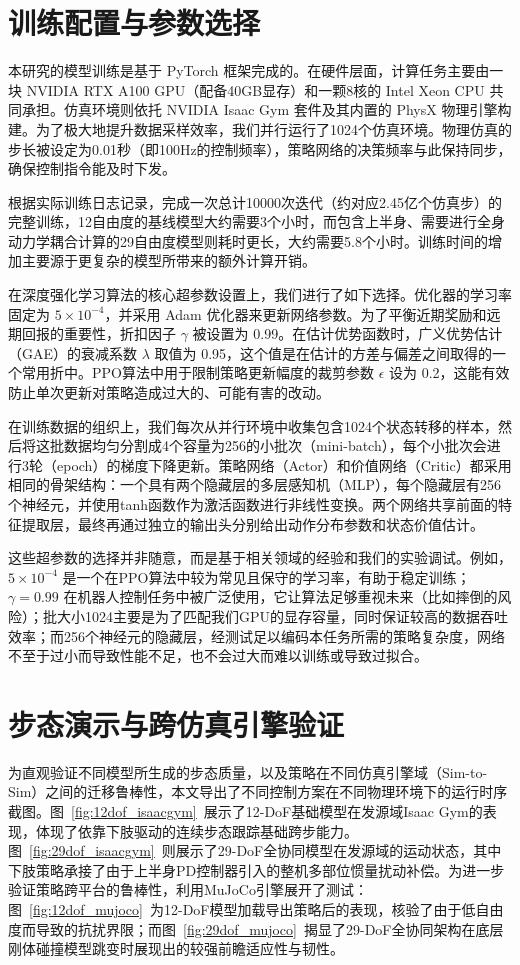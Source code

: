 \section{训练配置与参数选择}
\label{sec:training_config}

本研究的模型训练是基于 PyTorch 框架完成的。在硬件层面，计算任务主要由一块 NVIDIA RTX A100 GPU（配备40GB显存）和一颗8核的 Intel Xeon CPU 共同承担。仿真环境则依托 NVIDIA Isaac Gym 套件及其内置的 PhysX 物理引擎构建。为了极大地提升数据采样效率，我们并行运行了1024个仿真环境。物理仿真的步长被设定为0.01秒（即100Hz的控制频率），策略网络的决策频率与此保持同步，确保控制指令能及时下发。

根据实际训练日志记录，完成一次总计10000次迭代（约对应2.45亿个仿真步）的完整训练，12自由度的基线模型大约需要3个小时，而包含上半身、需要进行全身动力学耦合计算的29自由度模型则耗时更长，大约需要5.8个小时。训练时间的增加主要源于更复杂的模型所带来的额外计算开销。

在深度强化学习算法的核心超参数设置上，我们进行了如下选择。优化器的学习率固定为 $5 \times 10^{-4}$，并采用 Adam 优化器来更新网络参数。为了平衡近期奖励和远期回报的重要性，折扣因子 $\gamma$ 被设置为 0.99。在估计优势函数时，广义优势估计（GAE）的衰减系数 $\lambda$ 取值为 0.95，这个值是在估计的方差与偏差之间取得的一个常用折中。PPO算法中用于限制策略更新幅度的裁剪参数 $\epsilon$ 设为 0.2，这能有效防止单次更新对策略造成过大的、可能有害的改动。

在训练数据的组织上，我们每次从并行环境中收集包含1024个状态转移的样本，然后将这批数据均匀分割成4个容量为256的小批次（mini-batch），每个小批次会进行3轮（epoch）的梯度下降更新。策略网络（Actor）和价值网络（Critic）都采用相同的骨架结构：一个具有两个隐藏层的多层感知机（MLP），每个隐藏层有256个神经元，并使用tanh函数作为激活函数进行非线性变换。两个网络共享前面的特征提取层，最终再通过独立的输出头分别给出动作分布参数和状态价值估计。

这些超参数的选择并非随意，而是基于相关领域的经验和我们的实验调试。例如，$5 \times 10^{-4}$ 是一个在PPO算法中较为常见且保守的学习率，有助于稳定训练；$\gamma=0.99$ 在机器人控制任务中被广泛使用，它让算法足够重视未来（比如摔倒的风险）；批大小1024主要是为了匹配我们GPU的显存容量，同时保证较高的数据吞吐效率；而256个神经元的隐藏层，经测试足以编码本任务所需的策略复杂度，网络不至于过小而导致性能不足，也不会过大而难以训练或导致过拟合。
\section{步态演示与跨仿真引擎验证}

为直观验证不同模型所生成的步态质量，以及策略在不同仿真引擎域（Sim-to-Sim）之间的迁移鲁棒性，本文导出了不同控制方案在不同物理环境下的运行时序截图。图~\ref{fig:12dof_isaacgym}~展示了12-DoF基础模型在发源域Isaac Gym的表现，体现了依靠下肢驱动的连续步态跟踪基础跨步能力。图~\ref{fig:29dof_isaacgym}~则展示了29-DoF全协同模型在发源域的运动状态，其中下肢策略承接了由于上半身PD控制器引入的整机多部位惯量扰动补偿。为进一步验证策略跨平台的鲁棒性，利用MuJoCo引擎展开了测试：图~\ref{fig:12dof_mujoco}~为12-DoF模型加载导出策略后的表现，核验了由于低自由度而导致的抗扰界限；而图~\ref{fig:29dof_mujoco}~揭显了29-DoF全协同架构在底层刚体碰撞模型跳变时展现出的较强前瞻适应性与韧性。

